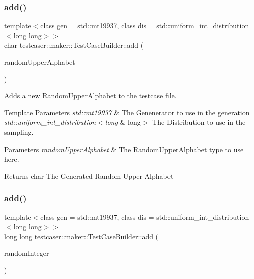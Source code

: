 \subsubsection{\texorpdfstring{add()}{add()}\hspace{0.1cm}{\footnotesize\ttfamily [3/11]}}
{\footnotesize\ttfamily template$<$class gen  = std\+::mt19937, class dis  = std\+::uniform\+\_\+int\+\_\+distribution$<$long long$>$$>$ \\
char testcaser\+::maker\+::\+Test\+Case\+Builder\+::add (\begin{DoxyParamCaption}\item[{\mbox{\hyperlink{classtestcaser_1_1maker_1_1types_1_1RandomUpperAlphabet}{types\+::\+Random\+Upper\+Alphabet}}$<$ gen, dis $>$ \&}]{random\+Upper\+Alphabet }\end{DoxyParamCaption})\hspace{0.3cm}{\ttfamily [inline]}}



Adds a new Random\+Upper\+Alphabet to the testcase file. 


\begin{DoxyTemplParams}{Template Parameters}
{\em std\+::mt19937} & The Genenerator to use in the generation \\
\hline
{\em std\+::uniform\+\_\+int\+\_\+distribution$<$long} & long$>$ The Distribution to use in the sampling. \\
\hline
\end{DoxyTemplParams}

\begin{DoxyParams}{Parameters}
{\em random\+Upper\+Alphabet} & The Random\+Upper\+Alphabet type to use here. \\
\hline
\end{DoxyParams}
\begin{DoxyReturn}{Returns}
char The Generated Random Upper Alphabet 
\end{DoxyReturn}
\mbox{\label{classtestcaser_1_1maker_1_1TestCaseBuilder_a2ef119caff9fb4bd1b313964af9e77e0}} 
\subsubsection{\texorpdfstring{add()}{add()}\hspace{0.1cm}{\footnotesize\ttfamily [4/11]}}
{\footnotesize\ttfamily template$<$class gen  = std\+::mt19937, class dis  = std\+::uniform\+\_\+int\+\_\+distribution$<$long long$>$$>$ \\
long long testcaser\+::maker\+::\+Test\+Case\+Builder\+::add (\begin{DoxyParamCaption}\item[{\mbox{\hyperlink{classtestcaser_1_1maker_1_1types_1_1RandomInteger}{types\+::\+Random\+Integer}}$<$ gen, dis $>$ \&}]{random\+Integer }\end{DoxyParamCaption})\hspace{0.3cm}{\ttfamily [inline]}}



